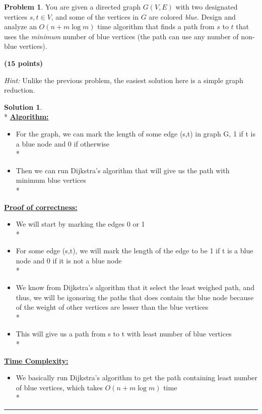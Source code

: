 \documentclass{article}
\theoremstyle{definition}
\newtheorem{problem}{Problem}
\def\fline{\rule{0.75\linewidth}{0.5pt}}
\newcommand{\finishline}{\vspace{-15pt}\begin{center}\fline\end{center}}
\newtheorem*{solution*}{Solution}
\newenvironment{solution}{\begin{solution*}}{{\finishline} \end{solution*}}
\newcommand{\grade}[1]{\hfill{\textbf{($\mathbf{#1}$ points)}}}
\begin{document}
\begin{problem}

You are given a directed graph $G(V,E)$ with two designated vertices $s,t \in V$, and some of the vertices in $G$ are colored \emph{blue}. 
Design and analyze an $O(n+m\log{m})$ time algorithm that finds a path from $s$ to $t$ that uses the \emph{minimum} number of blue vertices (the path can use any  number of non-blue vertices).  

\grade{15}

\emph{Hint:} Unlike the previous problem, the easiest solution here is a simple graph reduction. 
\end{problem}

\begin{solution}
	\hfill \bigskip\\*
	\textbf{\underline{Algorithm:}}
		\begin{itemize}
			\item For the graph, we can mark the length of some edge (s,t) in graph G, 1 if t is a blue node and 0 if otherwise \\*
			\item Then we can run Dijkstra's algorithm that will give us the path with minimum blue vertices \\*
		\end{itemize} 		
	\textbf{\underline{Proof of correctness:}} 	
		\begin{itemize}
			\item We will start by marking the edges 0 or 1 \\*
			\item For some edge (s,t), we will mark the length of the edge to be 1 if t is a blue node and 0 if it is not a blue node\\*
			\item We know from Dijkstra's algorithm that it select the least weighed path, and thus, we will be igonoring the paths that does contain the blue node because of the weight of other vertices are lesser than the blue vertices \\*
			\item This will give us a path from s to t with least number of blue vertices \\*
		\end{itemize} 
	\textbf{\underline{Time Complexity:}} 
		\begin{itemize}
			\item We basically run Dijkstra's algorithm to get the path containing least number of blue vertices, which takes $O(n+m\log{m})$ time \\*
		\end{itemize} 
\end{solution}
\end{document}
